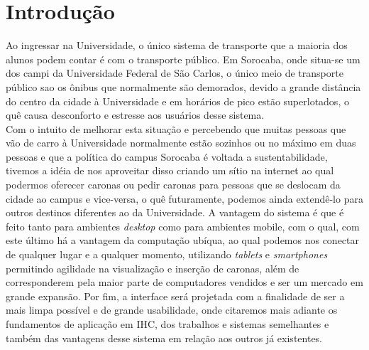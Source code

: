 \documentclass{sig-alternate}
\begin{document}
\section{Introdução}
Ao ingressar na Universidade, o único sistema de transporte que a maioria 
dos alunos podem contar é com o transporte público. Em Sorocaba, onde 
situa-se um dos campi da Universidade Federal de São Carlos, o único 
meio de transporte público sao os ônibus que normalmente são demorados, 
devido a grande distância do centro da cidade à Universidade e em horários 
de pico estão superlotados, o quê causa desconforto e estresse aos 
usuários desse sistema.\\
Com o intuito de melhorar esta situação e percebendo que muitas pessoas
 que vão de carro à Universidade normalmente estão sozinhos ou no máximo 
 em duas pessoas e que a política do campus Sorocaba é voltada a 
 sustentabilidade, tivemos a idéia de nos aproveitar disso criando um 
sítio na internet ao qual podermos oferecer caronas ou pedir caronas 
para pessoas que se deslocam da cidade ao campus e vice-versa, o quê 
futuramente, podemos ainda extendê-lo para outros destinos diferentes 
ao da Universidade. A vantagem do sistema é que é feito tanto 
para ambientes {\it desktop} como para ambientes mobile, com o qual, 
com este último há a vantagem da computação ubíqua, ao qual podemos nos 
conectar de qualquer lugar e a qualquer momento, utilizando {\it tablets} 
e {\it smartphones} permitindo agilidade na visualização e inserção de 
caronas, além de corresponderem pela maior parte de computadores vendidos 
e ser um mercado em grande expansão. Por fim, a interface será projetada 
com a finalidade de ser a mais limpa possível e de grande usabilidade,
onde citaremos mais adiante os fundamentos de aplicação em IHC, 
dos trabalhos e sistemas semelhantes e também das vantagens desse 
sistema em relação aos outros já existentes.
\end{document}
